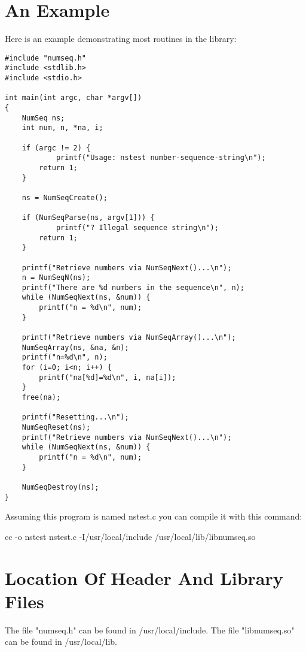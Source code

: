 \documentclass[letterpaper,twoside,10pt]{article}
\begin{document}
\section{An Example}
Here is an example demonstrating most routines in the library:
\begin{verbatim}
#include "numseq.h"
#include <stdlib.h>
#include <stdio.h>

int main(int argc, char *argv[]) 
{
    NumSeq ns;
    int num, n, *na, i;

    if (argc != 2) {
            printf("Usage: nstest number-sequence-string\n");
        return 1;
    }

    ns = NumSeqCreate();

    if (NumSeqParse(ns, argv[1])) {
            printf("? Illegal sequence string\n");
        return 1;
    }
    
    printf("Retrieve numbers via NumSeqNext()...\n");
    n = NumSeqN(ns);
    printf("There are %d numbers in the sequence\n", n);
    while (NumSeqNext(ns, &num)) {
        printf("n = %d\n", num);
    }

    printf("Retrieve numbers via NumSeqArray()...\n");
    NumSeqArray(ns, &na, &n);
    printf("n=%d\n", n);
    for (i=0; i<n; i++) {
        printf("na[%d]=%d\n", i, na[i]);
    }
    free(na);

    printf("Resetting...\n");
    NumSeqReset(ns);
    printf("Retrieve numbers via NumSeqNext()...\n");
    while (NumSeqNext(ns, &num)) {
        printf("n = %d\n", num);
    }

    NumSeqDestroy(ns); 
}
\end{verbatim}
Assuming this program is named nstest.c you can compile it with this
command:

cc -o nstest nstest.c -I/usr/local/include /usr/local/lib/libnumseq.so
\section{Location Of Header And Library Files}
The file "numseq.h" can be found in /usr/local/include.  The file
"libnumseq.so" can be found in /usr/local/lib.
\end{document}
